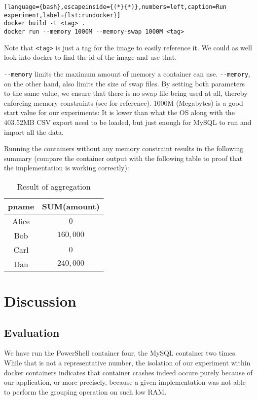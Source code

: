 \begin{lstlisting}[language={bash},escapeinside={(*}{*)},numbers=left,caption=Run experiment,label={lst:rundocker}]
docker build -t <tag> .
docker run --memory 1000M --memory-swap 1000M <tag>
\end{lstlisting}
Note that \verb+<tag>+ is just a tag for the image to easily reference it.
We could as well look into docker to find the id of the image and use that.

\verb+--memory+ limits the maximum amount of memory
a container can use. \verb+--memory+, on the other hand, also limits
the size of \gls{swap} files. By setting both parameters to the same value,
we ensure that there is no \gls{swap} file being used at all, thereby
enforcing memory constraints (see \cite{dockerMem}
for reference). 1000M (Megabytes) is a good start value
for our experiments: It is lower than what the OS along with the 403.52MB
CSV export need to be loaded, but just enough for MySQL to run and import
all the data.

Running the containers without any memory constraint results in the following
summary (compare the container output with the following table to proof
that the implementation is working correctly):

\begin{table}[htbp]
    \centering
    \begin{tabular}{|c|c|}
        \hline
        pname & SUM(amount) \\ \hline\hline
        Alice & $0$ \\ \hline
        Bob   & $160,000$ \\ \hline
        Carl  & $0$ \\ \hline
        Dan   & $240,000$ \\ \hline
    \end{tabular}
    \caption{Result of aggregation}
    \label{Result of aggregation}
\end{table}

\newpage

\section{Discussion}

\subsection{Evaluation}

We have run the PowerShell container four, the MySQL container two times.
While that is not a representative number, the isolation of our experiment
within docker containers indicates that container crashes indeed occure
purely because of our application, or more precisely, because a given implementation
was not able to perform the grouping operation on such low RAM.

